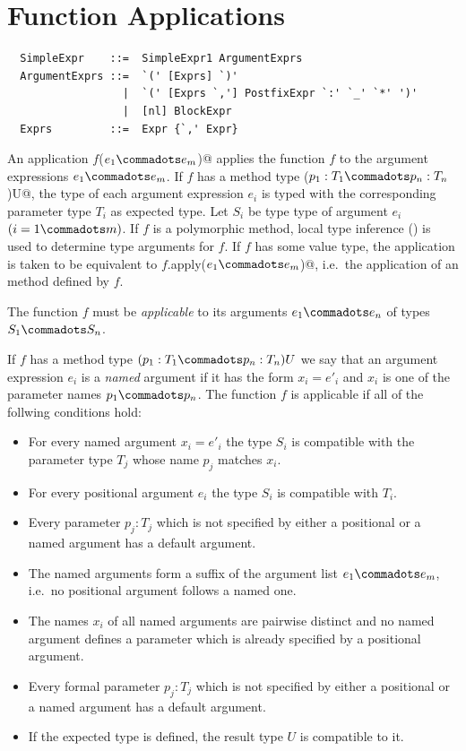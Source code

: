 \section{Function Applications}
\label{sec:apply}

\syntax\begin{lstlisting}
  SimpleExpr    ::=  SimpleExpr1 ArgumentExprs
  ArgumentExprs ::=  `(' [Exprs] `)'
                  |  `(' [Exprs `,'] PostfixExpr `:' `_' `*' ')'
                  |  [nl] BlockExpr
  Exprs         ::=  Expr {`,' Expr}
\end{lstlisting}

An application \lstinline@$f$($e_1 \commadots e_m$)@ applies the
function $f$ to the argument expressions $e_1 \commadots e_m$. If $f$
has a method type \lstinline@($p_1:T_1 \commadots p_n:T_n$)U@, the type of
each argument expression $e_i$ is typed with the
corresponding parameter type $T_i$ as expected type. Let $S_i$ be type
type of argument $e_i$ $(i = 1 \commadots m)$. If $f$ is a polymorphic method,
local type inference () is used to determine
type arguments for $f$. If $f$ has some value type, the application is taken to
be equivalent to \lstinline@$f$.apply($e_1 \commadots e_m$)@,
i.e.\ the application of an  method defined by $f$.

The function $f$ must be {\em applicable} to its arguments $e_1
\commadots e_n$ of types $S_1 \commadots S_n$.

If $f$ has a method type $(p_1:T_1 \commadots p_n:T_n)U$
we say that an argument expression $e_i$ is a {\em named} argument if
it has the form $x_i=e'_i$ and $x_i$ is one of the parameter names
$p_1 \commadots p_n$. The function $f$ is applicable if all of the follwing conditions
hold:

\begin{itemize}
\item For every named argument $x_i=e'_i$ the type $S_i$
  is compatible with the parameter type $T_j$ whose name $p_j$ matches $x_i$.
\item For every positional argument $e_i$ the type $S_i$
is compatible with $T_i$.
\item Every parameter $p_j:T_j$ which is not specified by either a positional
  or a named argument has a default argument.
\item The named arguments form a suffix of the argument list $e_1 \commadots e_m$,
  i.e.\ no positional argument follows a named one.
\item The names $x_i$ of all named arguments are pairwise distinct and no named
  argument defines a parameter which is already specified by a
  positional argument.
\item Every formal parameter $p_j:T_j$ which is not specified by either a positional
  or a named argument has a default argument.
\item If the expected type is defined, the result type $U$ is
compatible to it.
\end{itemize}

